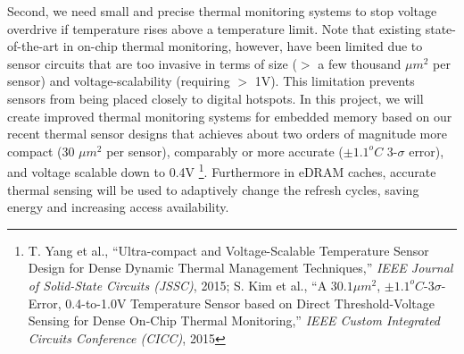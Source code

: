 Second, we need small and precise thermal monitoring systems to stop voltage overdrive if temperature rises above a temperature limit. 
Note that existing state-of-the-art in on-chip thermal monitoring, however, have been limited due to sensor circuits that are too invasive in terms of size ($>$ a few thousand $\mu m^2$ per sensor) and voltage-scalability (requiring $>$ 1V). 
This limitation prevents sensors from being placed closely to digital hotspots. 
In this project, we will create improved thermal monitoring systems for embedded memory based on our recent thermal sensor designs that achieves about two orders of magnitude more compact (30 $\mu m^2$ per sensor), comparably or more accurate ($\pm 1.1^oC$ 3-$\sigma$ error), and voltage scalable down to 0.4V  \footnote{T. Yang et al., ``Ultra-compact and Voltage-Scalable Temperature Sensor Design for Dense Dynamic Thermal Management Techniques,'' \textit{IEEE Journal of Solid-State Circuits (JSSC)}, 2015; S. Kim et al., ``A $30.1\mu m^{2}$, $\pm 1.1^{o}C$-$3\sigma$-Error, 0.4-to-1.0V Temperature Sensor based on Direct Threshold-Voltage Sensing for Dense On-Chip Thermal Monitoring,'' \textit{IEEE Custom Integrated Circuits Conference (CICC)}, 2015}. 
Furthermore in eDRAM caches, accurate thermal sensing will be used to adaptively change the refresh cycles, saving energy and increasing access availability. 

